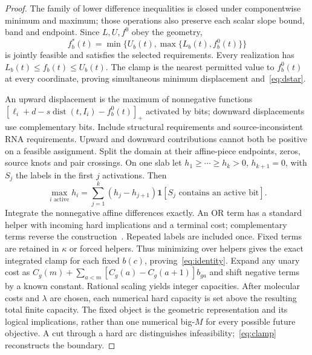 \documentclass[10pt,letterpaper]{article}
\newcommand{\ind}{\mathbf 1}
\newcommand{\dist}{\operatorname{dist}}
\begin{document}
\begin{proof}
The family of lower difference inequalities is closed under componentwise minimum and maximum; those operations also preserve each scalar slope bound, band and endpoint. Since $L,U,f^0$ obey the geometry,
\begin{equation}
f_b^*(t)=\min\{U_b(t),\max\{L_b(t),f_b^0(t)\}\}\label{eq:clamp}
\end{equation}
is jointly feasible and satisfies the selected requirements. Every realization has $L_b(t)\le f_b(t)\le U_b(t)$. The clamp is the nearest permitted value to $f_b^0(t)$ at every coordinate, proving simultaneous minimum displacement and~\eqref{eq:dstar}.

An upward displacement is the maximum of nonnegative functions $[\ell_i+d-s\dist(t,I_i)-f_b^0(t)]_+$ activated by bits; downward displacements use complementary bits. Include structural requirements and source-inconsistent RNA requirements. Upward and downward contributions cannot both be positive on a feasible assignment. Split the domain at their affine-piece endpoints, zeros, source knots and pair crossings. On one slab let $h_1\ge\cdots\ge h_k>0$, $h_{k+1}=0$, with $S_j$ the labels in the first $j$ activations. Then
\begin{equation}
\max_{i\text{ active}}h_i=\sum_{j=1}^k(h_j-h_{j+1})\ind[S_j\text{ contains an active bit}].\label{eq:layers}
\end{equation}
Integrate the nonnegative affine differences exactly. An OR term has a standard helper with incoming hard implications and a terminal cost; complementary terms reverse the construction~\cite{kz,kohli}. Repeated labels are included once. Fixed terms are retained in $\kappa$ or forced helpers. Thus minimizing over helpers gives the exact integrated clamp for each fixed $b(c)$, proving~\eqref{eq:identity}. Expand any unary cost as $C_g(m)+\sum_{a<m}[C_g(a)-C_g(a+1)]b_{ga}$ and shift negative terms by a known constant. Rational scaling yields integer capacities. After molecular costs and $\lambda$ are chosen, each numerical hard capacity is set above the resulting total finite capacity. The fixed object is the geometric representation and its logical implications, rather than one numerical big-$M$ for every possible future objective. A cut through a hard arc distinguishes infeasibility;~\eqref{eq:clamp} reconstructs the boundary.
\end{proof}
\end{document}
